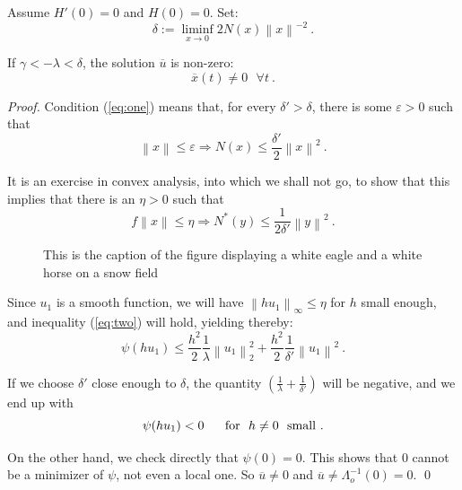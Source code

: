 %
\begin{proposition}
Assume $H'(0)=0$ and $ H(0)=0$. Set:
\begin{equation}
  \delta := \liminf_{x\to 0} 2 N (x) \left\|x\right\|^{-2}\ .
  \label{eq:one}
\end{equation}

If $\gamma < - \lambda < \delta$,
the solution $\overline{u}$ is non-zero:
\begin{equation}
  \overline{x} (t) \ne 0\ \ \ \forall t\ .
\end{equation}
\end{proposition}
%
\begin{proof}
Condition (\ref{eq:one}) means that, for every
$\delta ' > \delta$, there is some $\varepsilon > 0$ such that
\begin{equation}
  \left\|x\right\| \le \varepsilon \Rightarrow N (x) \le
  \frac{\delta '}{2} \left\|x\right\|^{2}\ .
\end{equation}

It is an exercise in convex analysis, into which we shall not go, to
show that this implies that there is an $\eta > 0$ such that
\begin{equation}
  f\left\|x\right\| \le \eta
  \Rightarrow N^{\ast} (y) \le \frac{1}{2\delta '}
  \left\|y\right\|^{2}\ .
  \label{eq:two}
\end{equation}

\begin{figure}
\vspace{2.5cm}
\caption{This is the caption of the figure displaying a white eagle and
a white horse on a snow field}
\end{figure}

Since $u_{1}$ is a smooth function, we will have
$\left\|hu_{1}\right\|_\infty \le \eta$
for $h$ small enough, and inequality (\ref{eq:two}) will hold,
yielding thereby:
\begin{equation}
  \psi (hu_{1}) \le \frac{h^{2}}{2}
  \frac{1}{\lambda} \left\|u_{1} \right\|_{2}^{2} + \frac{h^{2}}{2}
  \frac{1}{\delta '} \left\|u_{1}\right\|^{2}\ .
\end{equation}

If we choose $\delta '$ close enough to $\delta$, the quantity
$\left(\frac{1}{\lambda} + \frac{1}{\delta '}\right)$
will be negative, and we end up with
\begin{equation}
  \psi (hu_{1}) < 0\ \ \ \ \ {\rm for}\ \ h\ne 0\ \ {\rm small}\ .
\end{equation}

On the other hand, we check directly that $\psi (0) = 0$. This shows
that 0 cannot be a minimizer of $\psi$, not even a local one.
So $\overline{u} \ne 0$ and
$\overline{u} \ne \Lambda_{o}^{-1} (0) = 0$. \qed
\end{proof}
